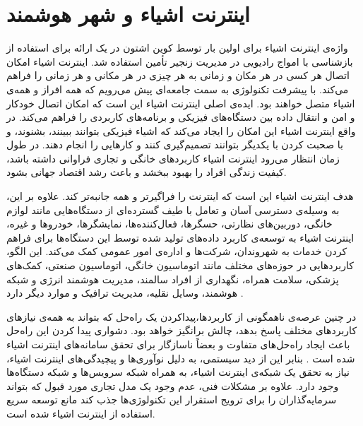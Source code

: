     \section{اینترنت اشیاء و شهر هوشمند}
    واژه‌ی اینترنت اشیاء برای اولین بار توسط کوین اشتون در یک ارائه برای استفاده از بازشناسی با امواج رادیویی در مدیریت زنجیر تأمین استفاده شد\cite{shton2009that}.
    اینترنت اشیاء امکان اتصال هر کسی در هر مکان و زمانی به هر چیزی در هر مکانی و هر زمانی را فراهم می‌کند.
    با پیشرفت تکنولوژی به سمت جامعه‌ای پیش می‌رویم که همه افراز و همه‌ی اشیاء متصل خواهند بود\cite{zheng2011internet}.
    ایده‌ی اصلی اینترنت اشیاء این است که امکان اتصال خودکار و امن و انتقال داده‌ بین دستگاه‌های فیزیکی و برنامه‌های کاربردی را فراهم می‌کند.
    در واقع اینترنت اشیاء این امکان را ایجاد می‌کند که اشیاء فیزیکی بتوانند ببینند، بشنوند، و با صحبت کردن با یکدیگر بتوانند تصمیم‌گیری کنند و کار‌هایی را انجام دهند\cite{al2015internet}.
    در طول زمان انتظار می‌رود اینترنت اشیاء کاربرد‌های خانگی و تجاری فراوانی داشته باشد، کیفیت زندگی افراد را بهبود ببخشد و باعث رشد اقتصاد جهانی بشود.

    هدف اینترنت اشیاء این است که اینترنت را فراگیرتر و همه جانبه‌تر کند.
    علاوه بر این، به وسیله‌ی دسترسی آسان و تعامل با طیف گسترده‌ای از دستگاه‌هایی مانند لوازم خانگی، دوربین‌های نظارتی، حسگر‌ها، فعال‌کننده‌ها، نمایشگر‌ها، خودرو‌ها و غیره، اینترنت اشیاء به توسعه‌ی کاربرد داده‌های تولید شده توسط این دستگاه‌ها برای فراهم کردن خدمات به شهروندان، شرکت‌ها و اداره‌ی امور عمومی کمک می‌کند.
    این الگو، کاربرد‌هایی در حوزه‌های مختلف مانند اتوماسیون خانگی، اتوماسیون صنعتی، کمک‌های پزشکی، سلامت همراه، نگهداری از افراد سالمند، مدیریت هوشمند انرژی و شبکه هوشمند، وسایل نقلیه، مدیریت ترافیک و موارد دیگر دارد \cite{bellavista2013convergence}.

    در چنین عرصه‌ی ناهمگونی از کاربرد‌ها،پیداکردن یک راه‌حل که بتواند به همه‌ی نیاز‌های کاربرد‌های مختلف پاسخ بدهد، چالش برانگیز خواهد بود.
    دشواری پیدا کردن این راه‌حل باعث ایجاد راه‌حل‌های متفاوت و بعضاً ناسازگار برای تحقق سامانه‌های اینترنت اشیاء شده است \cite{zanella2014internet}.
    بنابر این از دید سیستمی، به دلیل نوآوری‌ها و پیچیدگی‌های اینترنت اشیاء، نیاز به تحقق یک شبکه‌ی اینترنت اشیاء، به همراه شبکه سرویس‌ها و شبکه دستگاه‌ها وجود دارد.
    علاوه بر مشکلات فنی، عدم وجود یک مدل تجاری مورد قبول که بتواند سرمایه‌گذاران را برای ترویج استقرار این تکنولوژی‌ها جذب کند مانع توسعه سریع استفاده از اینترنت اشیاء شده است\cite{laya2013investing}.

